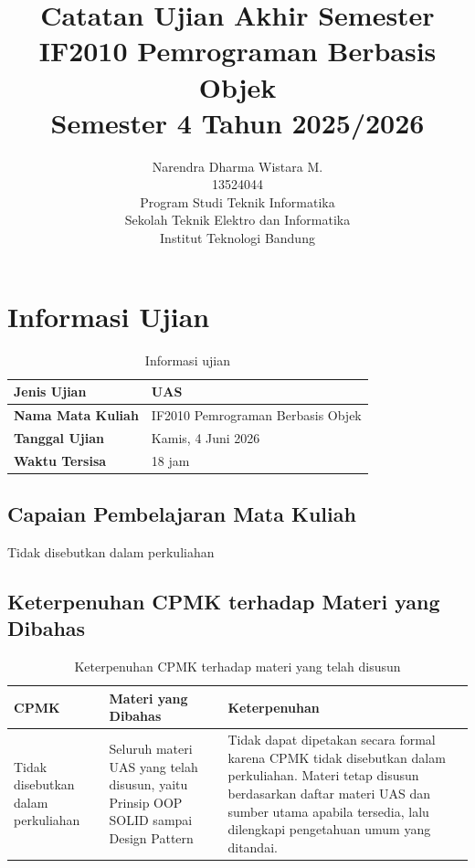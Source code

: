 \documentclass[11pt,a4paper]{article}
\title{%
    \vspace{-2cm}
    \textbf{\LARGE Catatan Ujian Akhir Semester} \\[0.25em]
    \Large IF2010 Pemrograman Berbasis Objek \\[0.25em]
    \normalsize Semester 4 Tahun 2025/2026 \\[2em]
}
\author{%
    Narendra Dharma Wistara M. \\[0.25em]
    13524044 \\[2.5em]
    Program Studi Teknik Informatika \\[0.25em]
    Sekolah Teknik Elektro dan Informatika \\[0.25em]
    Institut Teknologi Bandung \\[0.25em]
}
\begin{document}
\begin{titlepage}
    \maketitle
    \thispagestyle{empty}
\end{titlepage}

\clearpage

\tableofcontents

\clearpage
{}

\section{Informasi Ujian}

\begin{table}[H]
\centering
\begin{tabularx}{\textwidth}{|L{0.30\textwidth}|X|}
\hline
\textbf{Jenis Ujian} & UAS \\
\hline
\textbf{Nama Mata Kuliah} & IF2010 Pemrograman Berbasis Objek \\
\hline
\textbf{Tanggal Ujian} & Kamis, 4 Juni 2026 \\
\hline
\textbf{Waktu Tersisa} & 18 jam \\
\hline
\end{tabularx}
\caption{Informasi ujian}
\label{tab:informasi-ujian}
\end{table}

\subsection{Capaian Pembelajaran Mata Kuliah}

Tidak disebutkan dalam perkuliahan

\subsection{Keterpenuhan CPMK terhadap Materi yang Dibahas}

\begin{table}[H]
\centering
\begin{tabularx}{\textwidth}{|L{0.36\textwidth}|L{0.22\textwidth}|X|}
\hline
\textbf{CPMK} & \textbf{Materi yang Dibahas} & \textbf{Keterpenuhan} \\
\hline
Tidak disebutkan dalam perkuliahan & Seluruh materi UAS yang telah disusun, yaitu Prinsip OOP SOLID sampai Design Pattern & Tidak dapat dipetakan secara formal karena CPMK tidak disebutkan dalam perkuliahan. Materi tetap disusun berdasarkan daftar materi UAS dan sumber utama apabila tersedia, lalu dilengkapi pengetahuan umum yang ditandai. \\
\hline
\end{tabularx}
\caption{Keterpenuhan CPMK terhadap materi yang telah disusun}
\label{tab:keterpenuhan-cpmk}
\end{table}
\end{document}
